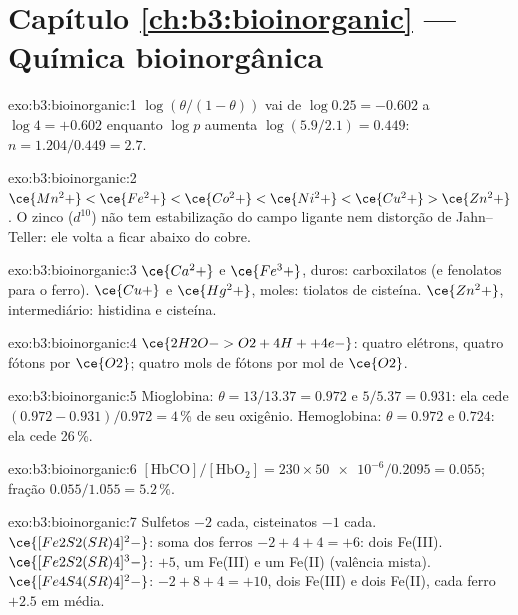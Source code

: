 \section*{Capítulo \ref{ch:b3:bioinorganic} --- Química bioinorgânica}

\begin{solution}{exo:b3:bioinorganic:1}
$\log(\theta/(1 - \theta))$ vai de $\log 0.25 = -0.602$ a $\log 4 = +0.602$ enquanto $\log p$ aumenta
$\log(5.9/2.1) = 0.449$: $n = 1.204/0.449 = 2.7$.
\end{solution}

\begin{solution}{exo:b3:bioinorganic:2}
$\ce{Mn^2+} < \ce{Fe^2+} < \ce{Co^2+} < \ce{Ni^2+} < \ce{Cu^2+} > \ce{Zn^2+}$. O zinco ($d^{10}$) não tem estabilização do campo ligante nem
distorção de Jahn--Teller: ele volta a ficar abaixo do cobre.
\end{solution}

\begin{solution}{exo:b3:bioinorganic:3}
$\ce{Ca^2+}$ e $\ce{Fe^3+}$, duros: carboxilatos (e fenolatos para o ferro). $\ce{Cu+}$ e $\ce{Hg^2+}$, moles:
tiolatos de cisteína. $\ce{Zn^2+}$, intermediário: histidina e cisteína.
\end{solution}

\begin{solution}{exo:b3:bioinorganic:4}
$\ce{2H2O -> O2 + 4H+ + 4e-}$: quatro elétrons, quatro fótons por $\ce{O2}$; quatro mols de fótons por
mol de $\ce{O2}$.
\end{solution}

\begin{solution}{exo:b3:bioinorganic:5}
Mioglobina: $\theta = 13/13.37 = 0.972$ e $5/5.37 = 0.931$: ela cede $(0.972 - 0.931)/0.972 = 4$\,\% de seu
oxigênio. Hemoglobina: $\theta = 0.972$ e $0.724$: ela cede 26\,\%.
\end{solution}

\begin{solution}{exo:b3:bioinorganic:6}
$[\mathrm{HbCO}]/[\mathrm{HbO_2}] = 230 \times \num{50e-6}/0.2095 = 0.055$; fração $0.055/1.055 = 5.2$\,\%.
\end{solution}

\begin{solution}{exo:b3:bioinorganic:7}
Sulfetos $-2$ cada, cisteinatos $-1$ cada. $\ce{[Fe2S2(SR)4]^2-}$: soma dos ferros $-2 + 4 + 4 = +6$: dois
Fe(III). $\ce{[Fe2S2(SR)4]^3-}$: $+5$, um Fe(III) e um Fe(II) (valência mista). $\ce{[Fe4S4(SR)4]^2-}$:
$-2 + 8 + 4 = +10$, dois Fe(III) e dois Fe(II), cada ferro $+2.5$ em média.
\end{solution}

